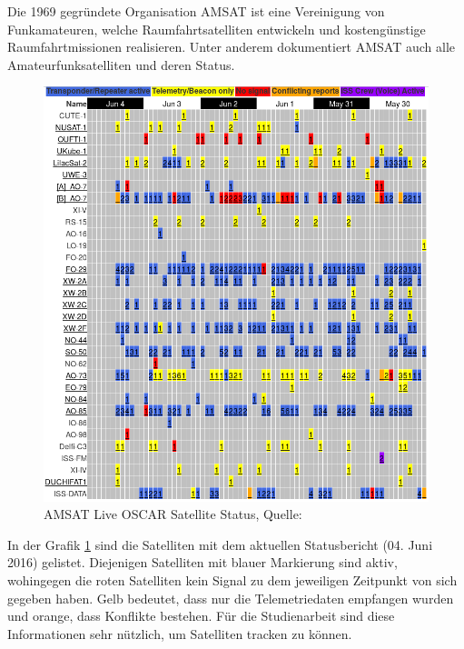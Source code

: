 \newpage
Die 1969 gegründete Organisation AMSAT ist eine Vereinigung von Funkamateuren, welche Raumfahrtsatelliten entwickeln und kostengünstige 
Raumfahrtmissionen realisieren. Unter anderem dokumentiert AMSAT auch alle Amateurfunksatelliten und deren Status. 
\begin{figure}[h]
 \centering
 \includegraphics[width=0.65\linewidth]{./images/amsatlist}
 \caption{AMSAT Live OSCAR Satellite Status, Quelle: \cite{amsat}}
 \label{fig:amsat}
\end{figure}
In der Grafik \ref{fig:amsat} sind die Satelliten mit dem aktuellen Statusbericht (04. Juni 2016) gelistet. Diejenigen Satelliten mit blauer 
Markierung sind aktiv, wohingegen die roten Satelliten kein Signal zu dem jeweiligen Zeitpunkt von sich gegeben haben. Gelb bedeutet, dass nur die 
Telemetriedaten empfangen wurden und orange, dass Konflikte bestehen. Für die Studienarbeit sind diese Informationen sehr nützlich, um Satelliten 
tracken zu können. 
